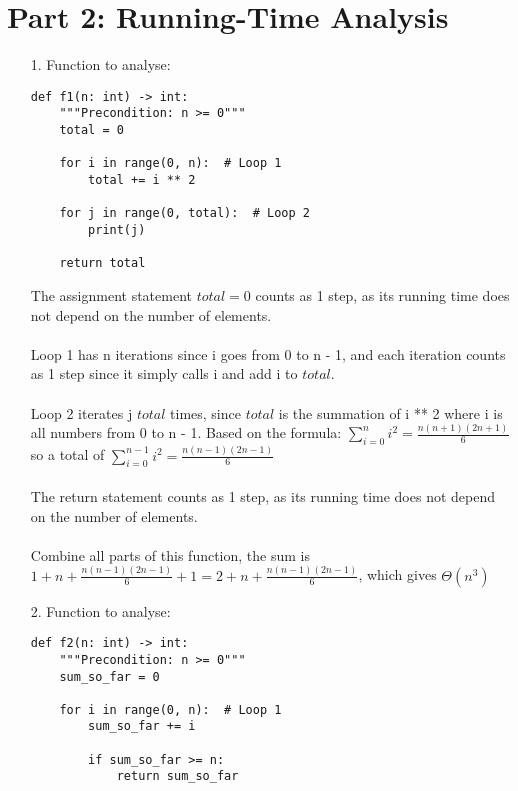 \documentclass[11pt]{article}
\begin{document}
\newpage


\section*{Part 2: Running-Time Analysis}

\begin{enumerate}
\item[1.]
Function to analyse:

\begin{verbatim}
def f1(n: int) -> int:
    """Precondition: n >= 0"""
    total = 0

    for i in range(0, n):  # Loop 1
        total += i ** 2

    for j in range(0, total):  # Loop 2
        print(j)

    return total
\end{verbatim}

The assignment statement $total = 0$ counts as 1 step, as its running time does not depend on the number of elements. \\
\\
Loop 1 has n iterations since i goes from 0 to n - 1, and each iteration counts as 1 step since it simply calls i and add i to $total$.\\
\\
Loop 2 iterates j $total$ times, since $total$ is the summation of i ** 2 where i is all numbers from 0 to n - 1. Based on the formula: $\sum_{i=0}^{n}i^{2} = \frac{n(n+1)(2n+1)}{6}$ so a total of $\sum_{i=0}^{n-1}i^{2} = \frac{n(n-1)(2n-1)}{6}$\\
\\
The return statement counts as 1 step, as its running time does not depend on the number of elements.\\
\\
Combine all parts of this function, the sum is $1 + n + \frac{n(n-1)(2n-1)}{6} + 1 = 2 + n + \frac{n(n-1)(2n-1)}{6}$, which gives $\Theta(n^{3})$

\newpage


\item[2.]
Function to analyse:

\begin{verbatim}
def f2(n: int) -> int:
    """Precondition: n >= 0"""
    sum_so_far = 0

    for i in range(0, n):  # Loop 1
        sum_so_far += i

        if sum_so_far >= n:
            return sum_so_far


\end{verbatim}
\end{enumerate}
\end{document}
